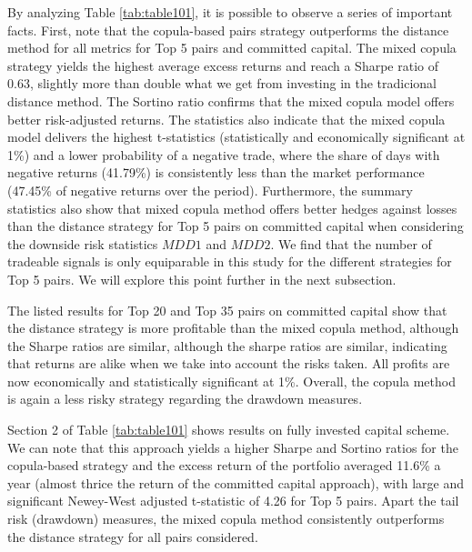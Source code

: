 \documentclass[a4paper]{article}
\begin{document}
By analyzing Table \ref{tab:table101}, it is possible to observe a series of important facts. First, note that the copula-based pairs strategy outperforms the distance method for all metrics for Top 5 pairs and committed capital. The mixed copula strategy yields the highest average excess returns and reach a Sharpe ratio of 0.63, slightly more than double what we get from investing in the tradicional distance method. The Sortino ratio confirms that the mixed copula model offers better risk-adjusted returns. The statistics also indicate that the mixed copula model delivers the highest t-statistics (statistically and economically significant at 1\%) and a lower probability of a negative trade, where the share of days with negative returns (41.79\%) is consistently less than the market performance (47.45\% of negative returns over the period). Furthermore, the summary statistics also show that mixed copula method offers better hedges against losses than the distance strategy for Top 5 pairs on committed capital when considering the downside risk statistics $MDD1$ and $MDD2$. We find that the number of tradeable signals is only equiparable in this study for the different strategies for Top 5 pairs. We will explore this point further in the next subsection.

 The listed results for Top 20 and Top 35 pairs on committed capital show that the distance strategy is more profitable than the mixed copula method, although the Sharpe ratios are similar, although the sharpe ratios are similar, indicating that returns are alike when we take into account the risks taken. All profits are now economically and statistically significant at 1\%. Overall, the copula method is again a less risky strategy regarding the drawdown measures.

Section 2 of Table \ref{tab:table101} shows results on fully invested capital scheme. We can note that this approach yields a higher Sharpe and Sortino ratios for the copula-based strategy and the excess return of the portfolio averaged 11.6\% a year (almost thrice the return of the committed capital approach), with large and significant Newey-West adjusted t-statistic of 4.26 for Top 5 pairs. Apart the tail risk (drawdown) measures, the mixed copula method consistently outperforms the distance strategy for all pairs considered.
\end{document}
